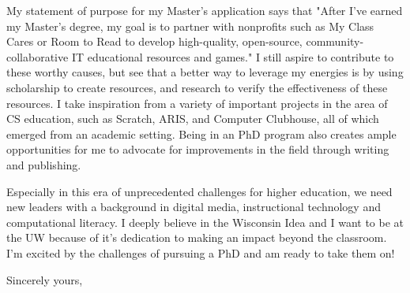\documentclass[12pt]{letter}
\begin{document}
\begin{letter}
My statement of purpose for my Master’s application says that "After I've earned my Master's degree, my goal is to partner with nonprofits such as My Class Cares or Room to Read to develop high-quality, open-source, community-collaborative IT educational resources and games." I still aspire to contribute to these worthy causes, but see that a better way to leverage my energies is by using scholarship to create resources, and research to verify the effectiveness of these resources. I take inspiration from a variety of important projects in the area of CS education, such as Scratch, ARIS, and Computer Clubhouse, all of which emerged from an academic setting. Being in an PhD program also creates ample opportunities for me to advocate for improvements in the field through writing and publishing. 

Especially in this era of unprecedented challenges for higher education, we need new leaders with a background in digital media, instructional technology and computational literacy. I deeply believe in the Wisconsin Idea and I want to be at the UW because of it’s dedication to making an impact beyond the classroom. I’m excited by the challenges of pursuing a PhD and am ready to take them on!



\closing{Sincerely yours,}









\end{letter}
\end{document}
